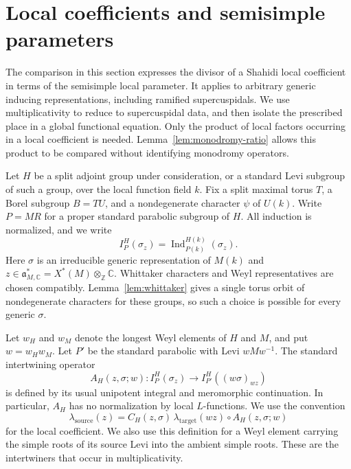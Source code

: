 \section{Local coefficients and semisimple parameters}
\label{sec:coefficients}

The comparison in this section expresses the divisor of a Shahidi local
coefficient in terms of the semisimple local parameter.  It applies to
arbitrary generic inducing representations, including ramified
supercuspidals.  We use multiplicativity to reduce to supercuspidal data,
and then isolate the prescribed place in a global functional equation.
Only the product of local factors occurring in a local coefficient is
needed.  Lemma~\ref{lem:monodromy-ratio} allows this product to be compared
without identifying monodromy operators.

Let $H$ be a split adjoint group under consideration, or a standard Levi
subgroup of such a group, over the local function field $k$.  Fix a split
maximal torus $T$, a Borel subgroup $B=TU$, and a nondegenerate character
$\psi$ of $U(k)$.  Write $P=MR$ for a proper standard parabolic subgroup
of $H$.  All induction is normalized, and we write
\[
 I_P^H(\sigma_z)=\operatorname{Ind}_{P(k)}^{H(k)}(\sigma_z).
\]
Here $\sigma$ is an irreducible generic representation of $M(k)$ and
$z\in\mathfrak a_{M,\mathbb C}^*=X^*(M)\otimes_{\mathbb Z}\mathbb C$.
Whittaker characters and Weyl representatives are chosen compatibly.
Lemma~\ref{lem:whittaker} gives a single torus orbit of nondegenerate
characters for these groups, so such a choice is possible for every
generic $\sigma$.

Let $w_H$ and $w_M$ denote the longest Weyl elements of $H$ and $M$, and
put $w=w_Hw_M$.  Let $P'$ be the standard parabolic with Levi
$wMw^{-1}$.  The standard intertwining operator
\[
 A_H(z,\sigma;w):I_P^H(\sigma_z)
       \longrightarrow I_{P'}^H((w\sigma)_{wz})
\]
is defined by its usual unipotent integral and meromorphic continuation.
In particular, $A_H$ has no normalization by local
$L$-functions.  We use the convention
\begin{equation}
 \lambda_{\mathrm{source}}(z)
   =C_H(z,\sigma)\,\lambda_{\mathrm{target}}(wz)
                         \circ A_H(z,\sigma;w)
 \label{eq:coefficient-definition}
\end{equation}
for the local coefficient.  We also use this definition for a Weyl
element carrying the simple roots of its source Levi into the ambient
simple roots.  These are the intertwiners that occur in multiplicativity.

